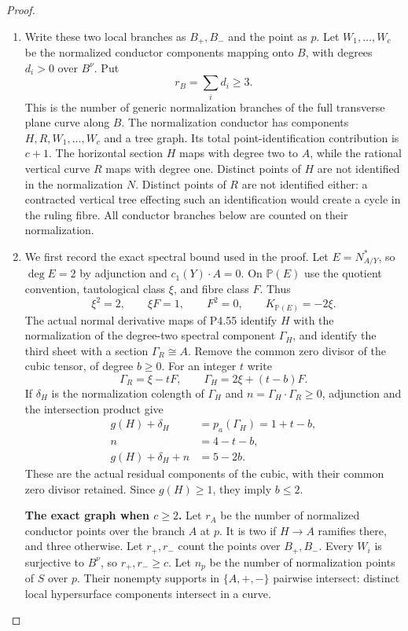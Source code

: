 \begin{proof}

\begin{enumerate}[label={$\langle1\rangle$\arabic*.},leftmargin=*]
\item Write these two local branches as $B_+,B_-$ and the
point as $p$. Let $W_1,\ldots,W_c$ be the normalized
conductor components mapping onto $B$, with degrees
$d_i>0$ over $B^\nu$. Put
\[
                         r_B=\sum_i d_i\ge3.
\]
This is the number of generic normalization branches
of the full transverse plane curve along $B$.
The normalization conductor has components
$H,R,W_1,\ldots,W_c$ and a tree graph. Its total
point-identification contribution is $c+1$.
The horizontal section $H$ maps with degree two to
$A$, while the rational vertical curve $R$ maps
with degree one. Distinct points of $H$ are not
identified in the normalization $N$. Distinct
points of $R$ are not identified either: a
contracted vertical tree effecting such an
identification would create a cycle in the ruling
fibre. All conductor branches below are counted
on their normalization.

\item We first record the exact spectral bound used in
the proof. Let $E=N_{A/Y}^*$, so $\deg E=2$ by
adjunction and $c_1(Y)\cdot A=0$. On $\mathbb P(E)$
use the quotient convention, tautological class
$\xi$, and fibre class $F$. Thus
\[
          \xi^2=2,\qquad \xi F=1,\qquad F^2=0,
          \qquad K_{\mathbb P(E)}=-2\xi.
\]
The actual normal derivative maps of P4.55 identify
$H$ with the normalization of the degree-two
spectral component $\Gamma_H$, and identify the
third sheet with a section $\Gamma_R\cong A$.
Remove the common zero divisor of the cubic tensor,
of degree $b\ge0$. For an integer $t$ write
\[
       \Gamma_R=\xi-tF,\qquad
       \Gamma_H=2\xi+(t-b)F.
\]
If $\delta_H$ is the normalization colength of
$\Gamma_H$ and $n=\Gamma_H\cdot\Gamma_R\ge0$,
adjunction and the intersection product give
\[
 \begin{split}
       g(H)+\delta_H&=p_a(\Gamma_H)=1+t-b,\\
       n&=4-t-b,\\
       g(H)+\delta_H+n&=5-2b.
 \end{split}                                                   \tag{R20.1}
\]
These are the actual residual components of the
cubic, with their common zero divisor retained.
Since $g(H)\ge1$, they imply $b\le2$.

\par\medskip\noindent\textbf{The exact graph when $c\ge2$.}
Let $r_A$ be the number of normalized conductor
points over the branch $A$ at $p$. It is two if
$H\to A$ ramifies there, and three otherwise.
Let $r_+,r_-$ count the points over $B_+,B_-$.
Every $W_i$ is surjective to $B^\nu$, so
$r_+,r_-\ge c$. Let $n_p$ be the number of
normalization points of $S$ over $p$.
Their nonempty supports in $\{A,+,-\}$ pairwise
intersect: distinct local hypersurface components
intersect in a curve.


\end{enumerate}
\end{proof}
